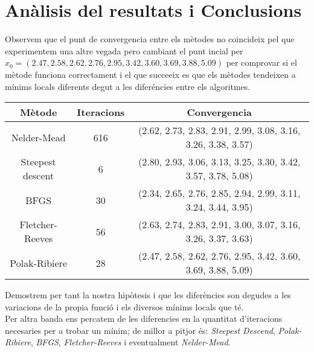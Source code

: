 \documentclass[a4paper, 11pt]{article}
\begin{document}
\section{Anàlisis del resultats i Conclusions}
Observem que el punt de convergencia entre els mètodes no coincideix pel que experimentem una altre vegada pero cambiant el punt incial per $x_0 = (2.47, 2.58, 2.62, 2.76, 2.95, 3.42, 3.60, 3.69, 3.88, 5.09)$ per comprovar si el mètode funciona correctament i el que succeeix es que els mètodes tendeixen a mínims locals diferents degut a les diferéncies entre els algoritmes.
\begin{center}
  \begin{tabular}{ c | c | c }
    \textbf{Mètode} & \textbf{Iteracions} & \textbf{Convergencia} \\ \hline
     Nelder-Mead & 616 & (2.62, 2.73, 2.83, 2.91, 2.99, 3.08, 3.16, 3.26, 3.38, 3.57) \\ \hline
     Steepest descent & 6 & (2.80, 2.93, 3.06, 3.13, 3.25, 3.30, 3.42, 3.57, 3.78, 5.08) \\ \hline
     BFGS & 30 & (2.34, 2.65, 2.76, 2.85, 2.94, 2.99, 3.11, 3.24, 3.44, 3.95) \\ \hline
     Fletcher-Reeves & 56 & (2.63, 2.74, 2.83, 2.91, 3.00, 3.07, 3.16, 3.26, 3.37, 3.63) \\ \hline
     Polak-Ribiere & 28 & (2.47, 2.58, 2.62, 2.76, 2.95, 3.42, 3.60, 3.69, 3.88, 5.09) \\ \hline
  \end{tabular}
\end{center}
Demostrem per tant la nostra hipòtesis i que les diferències son degudes a les variacions de la propia funció i els diversos mínims locals que té.\\
Per altra banda ens percatem de les diferencies en la quantitat d'iteracions necesaries per a trobar un mínim; de millor a pitjor és: \textit{Steepest Descend}, \textit{Polak-Ribiere}, \textit{BFGS}, \textit{Fletcher-Reeves} i eventualment \textit{Nelder-Mead}.
\newpage
\textcolor{white}{q}
\end{document}
